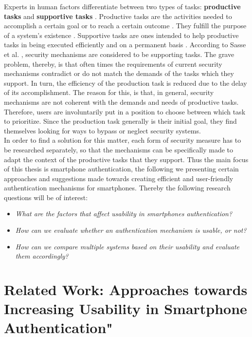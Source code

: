 Experts in human factors differentiate between two types of tasks: \textbf{productive tasks} and \textbf{supportive tasks} \cite{sasse}. Productive tasks are the activities needed to accomplish a certain goal or to reach a certain outcome \cite{sasse}. They fulfill the purpose of a system's existence \cite{sasse}. Supportive tasks are ones intended to help productive tasks in being executed efficiently and on a permanent basis \cite{sasse}. According to Sasse et al. \cite{sasse}, security mechanisms are considered to be supporting tasks. The grave problem, thereby, is that often times the requirements of current security mechanisms contradict or do not match the demands of the tasks which they support. In turn, the efficiency of the production task is reduced due to the delay of its accomplishment. The reason for this, is that, in general, security mechanisms are not coherent with the demands and needs of productive tasks. Therefore, users are involuntarily put in a position to choose between which task to prioritize. Since the production task generally is their initial goal, they find themselves looking for ways to bypass or neglect security systems. \\

In order to find a solution for this matter, each form of security measure has to be researched separately, so that the mechanisms can be specifically made to adapt the context of the productive tasks that they support. Thus the main focus of this thesis is smartphone authentication, the following we
presenting certain approaches and suggestions made towards creating efficient and user-friendly authentication mechanisms for smartphones. Thereby the following research questions will be of interest: 


\begin{itemize}
    \item \textit{What are the factors that affect usability in smartphones authentication?}
\item \textit{How can we evaluate whether an authentication mechanism is usable, or not?} 
    \item \textit{How can we compare multiple systems based on their usability and evaluate them accordingly?}
\end{itemize}


\section{Related Work: Approaches towards Increasing Usability in Smartphone Authentication"}


